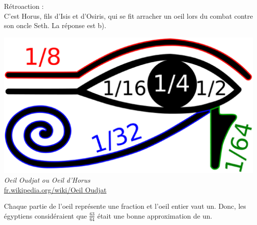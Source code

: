 \documentclass[letterpaper, 12pt]{article}
\begin{document}
R\'etroaction :\\
C'est Horus, fils d'Isis et d'Osiris, qui se fit arracher un oeil lors du combat contre son oncle Seth. La r\'eponse est b).
\begin{center}
\includegraphics[scale=0.15]{oeildHorus}\\
\emph{{\small Oeil Oudjat ou Oeil d'Horus}}\\
\href{http://fr.wikipedia.org/wiki/\%C5\%92il_Oudjat}{fr.wikipedia.org/wiki/Oeil Oudjat}\\
\end{center}
Chaque partie de l'oeil repr\'esente une fraction et l'oeil entier vaut un. Donc, les \'egyptiens consid\'eraient que $\frac{63}{64}$ \'etait une bonne approximation de un.\\
\end{document}
